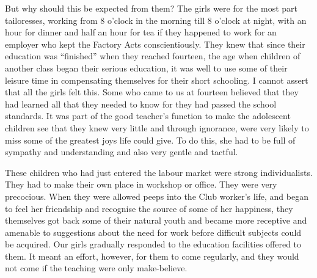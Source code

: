 But why should this be expected from them? The girls
were for the most part tailoresses, working from 8 o’clock
in the morning till 8 o’clock at night, with an hour for
dinner and half an hour for tea if they happened to work
for an employer who kept the Factory Acts conscientiously.
They knew that since their education was
“finished” when they reached fourteen, the age when
children of another class began their serious education, it
was well to use some of their leisure time in compensating
themselves for their short schooling. I cannot assert that
all the girls felt this. Some who came to us at fourteen
believed that they had learned all that they needed to
know for they had passed the school standards. It was
part of the good teacher’s function to make the adolescent
children see that they knew very little and through
ignorance, were very likely to miss some of the greatest
joys life could give. To do this, she had to be full of
sympathy and understanding and also very gentle and
tactful.

These children who had just entered the labour market
were strong individualists. They had to make their own
place in workshop or office. They were very precocious.
When they were allowed peeps into the Club worker's
life, and began to feel her friendship and recognise the
source of some of her happiness, they themselves got back
some of their natural youth and became more receptive
and amenable to suggestions about the need for work
before difficult subjects could be acquired. Our girls
gradually responded to the education facilities offered to
them. It meant an effort, however, for them to come
regularly, and they would not come if the teaching were
only make-believe.

